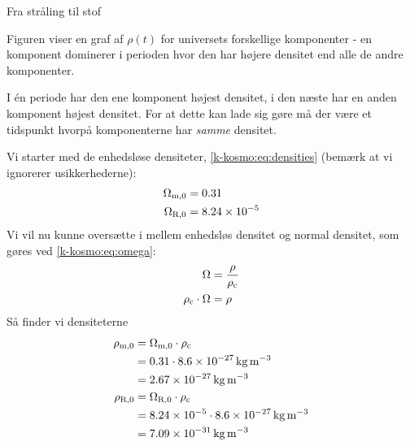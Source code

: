 \documentclass[crop=false, class=memoir]{standalone}
\begin{document}
\begin{opgave}[4]{Fra stråling til stof}

\opg Figuren viser en graf af $\rho(t)$ for universets forskellige komponenter - en komponent dominerer i perioden hvor den har højere densitet end alle de andre komponenter.

\opg I én periode har den ene komponent højest densitet, i den næste har en anden komponent højest densitet. For at dette kan lade sig gøre må der være et tidspunkt hvorpå komponenterne har \emph{samme} densitet.

\opg Vi starter med de enhedsløse densiteter, \cref{k-kosmo:eq:densities} (bemærk at vi ignorerer usikkerhederne):
\begin{align}
    \Omega_{\textup{m},0} &= \num{0,31} \\
    \Omega_{\textup{R},0} &= \num{8,24e-5}
\end{align}
Vi vil nu kunne oversætte i mellem enhedsløs densitet og normal densitet, som gøres ved \cref{k-kosmo:eq:omega}:
\begin{align}
    \Omega &= \frac{\rho}{\rho_\textup{c}} \\
    \rho_\textup{c} \cdot \Omega &= \rho
\end{align}
Så finder vi densiteterne
\begin{align}
    \rho_{\textup{m},0} &= \Omega_{\textup{m},0} \cdot \rho_\textup{c} \\
    &= \num{0,31} \cdot \SI{8,6e-27}{\kilogram \per \cubic \metre} \\
    &= \SI{2.67e-27}{\kilogram \per \cubic \metre} \\
    \rho_{\textup{R},0} &= \Omega_{\textup{R},0} \cdot \rho_\textup{c}\\
    &= \num{8,24e-5} \cdot \SI{8,6e-27}{\kilogram \per \cubic \metre} \\
    &= \SI{7.09e-31}{\kilogram \per \cubic \metre}
\end{align}


\end{opgave}
\end{document}

